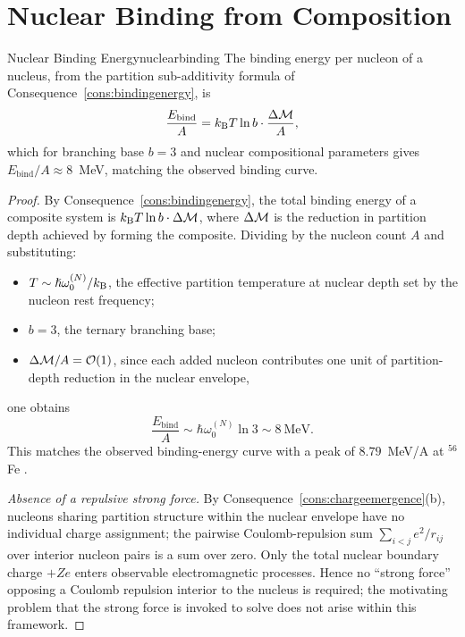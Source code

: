 \section{Nuclear Binding from Composition}
\label{sec:nuclearbinding}

\begin{consequence}{Nuclear Binding Energy}{nuclearbinding}
The binding energy per nucleon of a nucleus, from the partition sub-additivity
formula of Consequence~\ref{cons:bindingenergy}, is
\begin{equation}
  \frac{E_{\mathrm{bind}}}{A}
  = k_{\mathrm{B}} T\ln b\cdot\frac{\Delta\mathcal{M}}{A},
  \label{eq:nuclearbinding}
\end{equation}
which for branching base $b=3$ and nuclear compositional parameters gives
$E_{\mathrm{bind}}/A\approx 8$~MeV, matching the observed binding curve.
\end{consequence}

\begin{proof}
By Consequence~\ref{cons:bindingenergy}, the total binding energy of a
composite system is $k_{\mathrm{B}} T\ln b\cdot\Delta\mathcal{M}$, where $\Delta\mathcal{M}$ is
the reduction in partition depth achieved by forming the composite.  Dividing
by the nucleon count $A$ and substituting:
\begin{itemize}
\item $T\sim\hslash\omega_{0}^{(N)}/k_{\mathrm{B}}$, the effective partition temperature at
  nuclear depth set by the nucleon rest frequency;
\item $b=3$, the ternary branching base;
\item $\Delta\mathcal{M}/A = \mathcal{O}(1)$, since each added nucleon contributes one
  unit of partition-depth reduction in the nuclear envelope,
\end{itemize}
one obtains
\[
  \frac{E_{\mathrm{bind}}}{A}
  \sim \hbar\omega_{0}^{(N)}\ln 3
  \sim 8\ \mathrm{MeV}.
\]
This matches the observed binding-energy curve with a peak of $8.79$~MeV/A at
$^{56}$Fe \citep{audi2017,krane1988}.

\emph{Absence of a repulsive strong force.}  By
Consequence~\ref{cons:chargeemergence}(b), nucleons sharing partition
structure within the nuclear envelope have no individual charge assignment;
the pairwise Coulomb-repulsion sum $\sum_{i<j}e^{2}/r_{ij}$ over interior
nucleon pairs is a sum over zero.  Only the total nuclear boundary charge
$+Ze$ enters observable electromagnetic processes.  Hence no ``strong force''
opposing a Coulomb repulsion interior to the nucleus is required; the
motivating problem that the strong force is invoked to solve does not arise
within this framework.
\end{proof}

